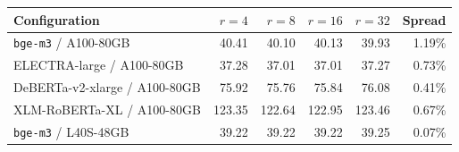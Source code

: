 \begin{tabular}{@{}lrrrrr@{}}
\toprule
Configuration & $r{=}4$ & $r{=}8$ & $r{=}16$ & $r{=}32$ & Spread \\
\midrule
\texttt{bge-m3} / A100-80GB & 40.41 & 40.10 & 40.13 & 39.93 & 1.19\% \\
ELECTRA-large / A100-80GB & 37.28 & 37.01 & 37.01 & 37.27 & 0.73\% \\
DeBERTa-v2-xlarge / A100-80GB & 75.92 & 75.76 & 75.84 & 76.08 & 0.41\% \\
XLM-RoBERTa-XL / A100-80GB & 123.35 & 122.64 & 122.95 & 123.46 & 0.67\% \\
\texttt{bge-m3} / L40S-48GB & 39.22 & 39.22 & 39.22 & 39.25 & 0.07\% \\
\bottomrule
\end{tabular}
